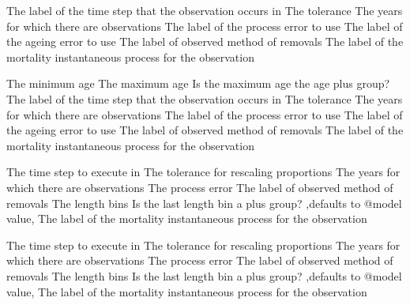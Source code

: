  {The label of the time step that the observation occurs in}
 {The tolerance}
 {The years for which there are observations}
 {The label of the process error to use}
 {The label of the ageing error to use}
 {The label of observed method of removals}
 {The label of the mortality instantaneous process for the observation}
\par\textbf{}\par
{} {The minimum age}
 {The maximum age}
 {Is the maximum age the age plus group?}
 {The label of the time step that the observation occurs in}
 {The tolerance}
 {The years for which there are observations}
 {The label of the process error to use}
 {The label of the ageing error to use}
 {The label of observed method of removals}
 {The label of the mortality instantaneous process for the observation}
\par\textbf{}\par
{} {The time step to execute in}
 {The tolerance for rescaling proportions}
 {The years for which there are observations}
 {The process error}
 {The label of observed method of removals}
 {The length bins}
 {Is the last length bin a plus group? ,defaults to @model value,}
 {The label of the mortality instantaneous process for the observation}
\par\textbf{}\par
{} {The time step to execute in}
 {The tolerance for rescaling proportions}
 {The years for which there are observations}
 {The process error}
 {The label of observed method of removals}
 {The length bins}
 {Is the last length bin a plus group? ,defaults to @model value,}
 {The label of the mortality instantaneous process for the observation}
